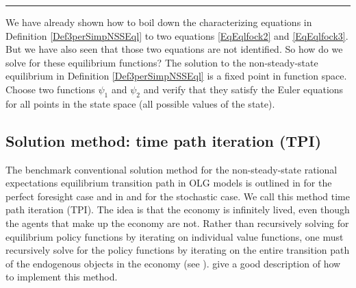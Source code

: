 \documentclass[letterpaper,12pt]{article}
\theoremstyle{definition}
\numberwithin{equation}{section}
\numberwithin{exercise}{section}
\begin{document}
      \vspace{-2mm}
      \hrule
      \vspace{5mm}
      \begin{spacing}{1.5}

      We have already shown how to boil down the characterizing equations in Definition \ref{Def3perSimpNSSEql} to two equations \eqref{EqEqlfock2} and \eqref{EqEqlfock3}. But we have also seen that those two equations are not identified. So how do we solve for these equilibrium functions? The solution to the non-steady-state equilibrium in Definition \ref{Def3perSimpNSSEql} is a fixed point in function space. Choose two functions $\psi_1$ and $\psi_2$ and verify that they satisfy the Euler equations for all points in the state space (all possible values of the state).


   \subsection{Solution method: time path iteration (TPI)}\label{Sec3perSimpTPI}

      The benchmark conventional solution method for the non-steady-state rational expectations equilibrium transition path in OLG models is outlined in \citet[ch. 4]{AuerbachKotlikoff:1987} for the perfect foresight case and in \citet[Appendix II]{NishiyamaSmetters:2007} and \citet[Sec. 3.1]{EvansPhillips:2014} for the stochastic case. We call this method time path iteration (TPI). The idea is that the economy is infinitely lived, even though the agents that make up the economy are not. Rather than recursively solving for equilibrium policy functions by iterating on individual value functions, one must recursively solve for the policy functions by iterating on the entire transition path of the endogenous objects in the economy (see \citet[ch. 17]{StokeyLucas1989}). \citet{EvansPhillips:2014} give a good description of how to implement this method.


\end{spacing}
\end{document}
